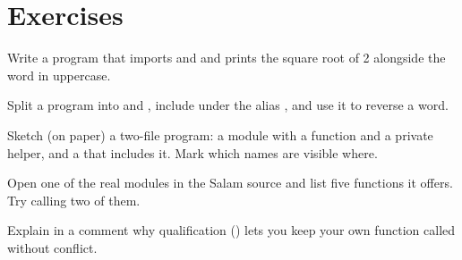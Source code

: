 \section{Exercises}

\exercise Write a program that imports  and  and prints
the square root of 2 alongside the word
 in uppercase.

\exercise Split a program into  and , include
 under the alias , and use it to reverse a word.

\exercise Sketch (on paper) a two-file program: a  module with
a  function and a private helper, and a  that includes
it. Mark which names are visible where.

\exercise Open one of the real  modules in the Salam source and list
five  functions it offers. Try calling two of them.

\exercise Explain in a comment why qualification () lets you keep
your own function called  without conflict.
